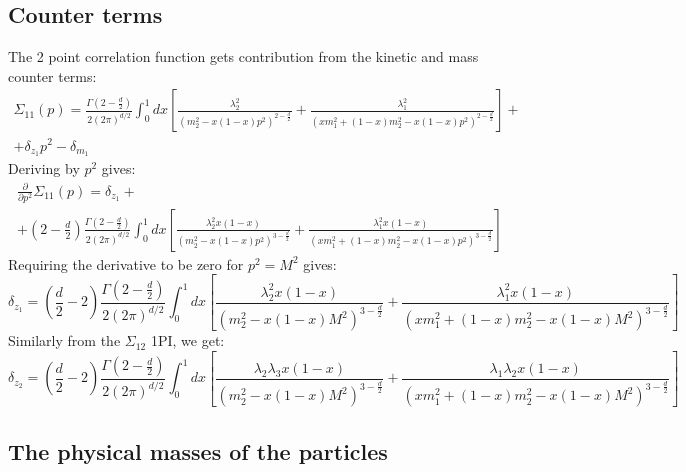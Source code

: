 \documentclass{article}
\begin{document}
\subsection{Counter terms}
The 2 point correlation function gets contribution from the kinetic and mass counter terms:
\begin{equation}
\begin{gathered}
    \Sigma_{11}(p) = \frac{\Gamma\left(2 - \frac{d}{2}\right)}{2(2\pi)^{d/2}}\int_0^1dx \left[\frac{\lambda_2^2}{\left(m_2^2 - x(1 - x)p^2\right)^{2 - \frac{d}{2}}} + \frac{\lambda_1^2}{\left(xm_1^2 + (1 - x)m_2^2 - x(1 - x)p^2\right)^{2 - \frac{d}{2}}}\right] + \\ +
    \delta_{z_1}p^2 - \delta_{m_1}
\end{gathered}
\end{equation}
Deriving by $p^2$ gives:
\begin{equation}
\begin{gathered}
    \frac{\partial}{\partial p^2} \Sigma_{11}(p) = \delta_{z_1} + \\ +
    \left(2 - \frac{d}{2}\right)\frac{\Gamma\left(2 - \frac{d}{2}\right)}{2(2\pi)^{d/2}}\int_0^1dx \left[\frac{\lambda_2^2x(1 - x)}{\left(m_2^2 - x(1 - x)p^2\right)^{3 - \frac{d}{2}}} + \frac{\lambda_1^2x(1 - x)}{\left(xm_1^2 + (1 - x)m_2^2 - x(1 - x)p^2\right)^{3 - \frac{d}{2}}}\right]
\end{gathered}
\end{equation}
Requiring the derivative to be zero for $p^2 = M^2$ gives:
\begin{equation}
    \delta_{z_1} = \left(\frac{d}{2} - 2\right)\frac{\Gamma\left(2 - \frac{d}{2}\right)}{2(2\pi)^{d/2}}\int_0^1dx \left[\frac{\lambda_2^2x(1 - x)}{\left(m_2^2 - x(1 - x)M^2\right)^{3 - \frac{d}{2}}} + \frac{\lambda_1^2x(1 - x)}{\left(xm_1^2 + (1 - x)m_2^2 - x(1 - x)M^2\right)^{3 - \frac{d}{2}}}\right]
\end{equation}
Similarly from the $\Sigma_{12}$ 1PI, we get:
\begin{equation}
    \delta_{z_2} = \left(\frac{d}{2} - 2\right)\frac{\Gamma\left(2 - \frac{d}{2}\right)}{2(2\pi)^{d/2}}\int_0^1dx \left[\frac{\lambda_2\lambda_3x(1 - x)}{\left(m_2^2 - x(1 - x)M^2\right)^{3 - \frac{d}{2}}} + \frac{\lambda_1\lambda_2x(1 - x)}{\left(xm_1^2 + (1 - x)m_2^2 - x(1 - x)M^2\right)^{3 - \frac{d}{2}}}\right]
\end{equation}
\subsection{The physical masses of the particles}
\end{document}
